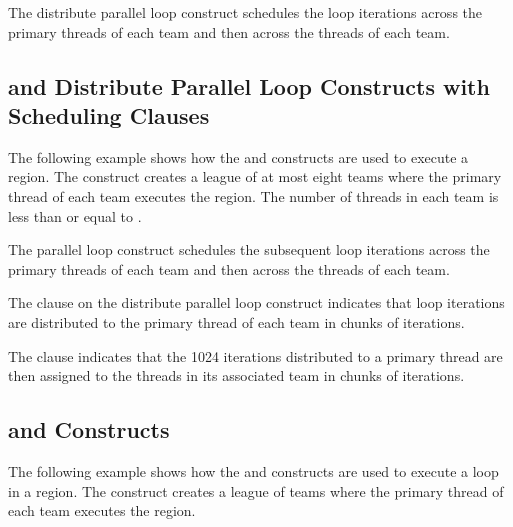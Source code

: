 The distribute parallel loop construct schedules the loop iterations across the 
primary threads of each team and then across the threads of each team.



\subsection{ and Distribute Parallel Loop 
Constructs with Scheduling Clauses}
\label{subsec:teams_distribute_parallel_schedule}

The following example shows how the  and 
constructs are used to execute a  region. The  
construct creates a league of at most eight teams where the primary thread of each 
team executes the  region. The number of threads in each team is 
less than or equal to .

The  parallel loop construct schedules the subsequent loop iterations 
across the primary threads of each team and then across the threads of each team.

The  clause on the distribute parallel loop construct indicates 
that loop iterations are distributed to the primary thread of each team in chunks 
of  iterations.

The  clause indicates that the 1024 iterations distributed to 
a primary thread are then assigned to the threads in its associated team in chunks 
of  iterations.



\subsection{ and  Constructs}
\label{subsec:teams_distribute_simd}

The following example shows how the  and  constructs are used to execute a loop in a  region. 
The  construct creates a league of teams where the 
primary thread of each team executes the  region.

